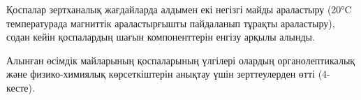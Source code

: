\begin{multicols}{2}
Қоспалар зертханалық жағдайларда алдымен екі негізгі майды араластыру
(20°C температурада магниттік араластырғышты пайдаланып тұрақты
араластыру), содан кейін қоспалардың шағын компоненттерін енгізу арқылы
алынды.

Алынған өсімдік майларының қоспаларының үлгілері олардың
органолептикалық және физико-химиялық көрсеткіштерін анықтау үшін
зерттеулерден өтті (4-кесте).
\end{multicols}

\begin{table}[H]
\caption*{4-кесте - Аралас майлардың физика-химиялық көрсеткіштері}
\centering
{}
\end{table}

